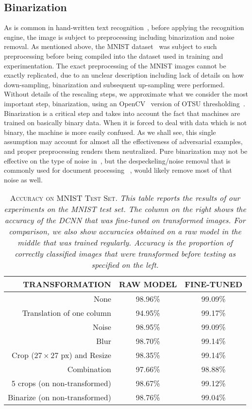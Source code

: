 \documentclass[conference]{IEEEtran}
\renewcommand\cap[3]{\caption[#2]{\label{#1}\textsc{#2}. \small\textit{#3}}}
\begin{document}
\subsection{Binarization}
As is common in hand-written text recognition~\cite{c19},  before applying the recognition engine, the image is subject to preprocessing including binarization and noise removal. As mentioned above, the MNIST dataset~\cite{c9} was subject to such preprocessing before being compiled into the dataset used in training and experimentation.  The exact preprocessing of the MNIST images cannot be exactly replicated, due to an unclear description including lack of details on how down-sampling, binarization and subsequent up-sampling were performed.  Without details of the rescaling steps,  we approximate what we consider the most important step, binarization,  using an OpenCV~\cite{c20} version  of OTSU thresholding~\cite{c21}.  Binarization  is a critical step and takes into account the fact that machines are trained on basically binary data.  When it is forced to deal with data which is not binary, the machine is more easily confused. As we shall see, this single assumption may account for almost all the effectiveness of adversarial examples, and proper preprocessing renders them neutralized. Pure binarization may not be effective on the type of noise in~\cite{c3}, but the despeckeling/noise removal that is commonly used for document processing ~\cite{c19,c22}, would likely remove most of that noise as well.


\begin{table}[t]
\footnotesize
\centering\vspace*{1.55ex}
\begin{tabular}{r|c|c}
\toprule
TRANSFORMATION              				& RAW MODEL	& FINE-TUNED\\ \midrule \midrule
None                        				& 98.96\%	& 99.09\%\\
Translation of one column   				& 94.95\%	& 99.17\%\\ 
Noise                       				& 98.95\%	& 99.09\%\\ 
Blur   	                    				& 98.70\%	& 99.14\%\\ 
Crop (27\,$\times$\,27 px) and Resize	& 98.35\%	& 99.14\%\\ 
Combination								& 97.66\% 	& 98.88\%\\ \midrule 
5 crops (on non-transformed)   			& 98.67\%	& 99.12\%\\
Binarize (on non-transformed)   			& 98.76\%	& 99.04\%\\
\bottomrule
\end{tabular}%
\cap{table:mnist}{Accuracy on MNIST Test Set}{This table reports the results of our experiments on the MNIST test set. The column on the right shows the accuracy of the DCNN that was fine-tuned on transformed images. For comparison, we also show accuracies obtained on a raw model in the middle that was trained regularly. Accuracy is the proportion of correctly classified images that were transformed before testing as specified on the left.}
\end{table}
\end{document}
